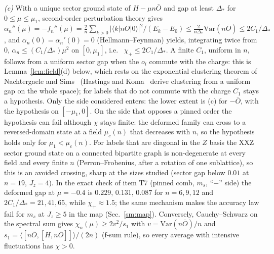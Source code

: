 \documentclass[aps,prx,onecolumn,10pt,nofootinbib,longbibliography,floatfix]{revtex4-2}
\theoremstyle{remark}
\newcommand{\Jz}{J_z}
\newcommand{\ms}{m_s}
\begin{document}
\emph{(c)} With a unique sector ground state of $H-\mu n\bar O$ and gap at least $\Delta_*$ for $0\le\mu\le\mu_1$, %
second-order perturbation theory gives $\alpha_n''(\mu)=-f_n''(\mu)=\frac2n\sum_{k>0} %
|\langle k|n\bar O|0\rangle|^2/(E_k-E_0)\le\frac{2}{n\Delta_*}\mathrm{Var}(n\bar O)\le2C_1/\Delta_*$, and %
$\alpha_n(0)=\alpha_n'(0)=0$ (Hellmann--Feynman) yields, integrating twice from $0$, $\alpha_n\le(C_1/\Delta_*)\mu^2$ on $[0,\mu_1]$, i.e.\ %
$\chi_+\le2C_1/\Delta_*$. A finite $C_1$, uniform in $n$, follows from a uniform sector gap when the $o_i$ commute %
with the charge: this is Lemma~\ref{lem:field}(d) below, which rests on the exponential clustering theorem of
Nachtergaele and Sims~\cite{nachtergaele2006} (Hastings and Koma~\cite{hastings2006} derive clustering from a uniform
gap on the whole space); for labels that do not commute with the charge $C_1$ stays a hypothesis. Only the side
considered enters:
the lower extent is (c) for $-\bar O$, with the hypothesis on $[-\mu_1,0]$. On the side that opposes a pinned order
the hypothesis can fail although $\chi$ stays finite: the deformed family can cross to a reversed-domain state at
a field $\mu_c(n)$ that decreases with $n$, so the hypothesis holds only for $\mu_1<\mu_c(n)$. For labels that are
diagonal in the $Z$ basis the XXZ sector ground state on a connected bipartite graph is non-degenerate at every
field and every finite $n$ (Perron--Frobenius, after a rotation of one sublattice), so this is an avoided crossing, sharp at the sizes studied
(sector gap below $0.01$ at $n=19$, $\Jz=4$). In the exact check %
of item T7 (pinned comb, $\ms$, ``$-$'' side) the deformed gap at $\mu=-0.4$ is $0.229$, $0.131$, $0.087$ for %
$n=6,9,12$ and $2C_1/\Delta_*=21,41,65$, while $\chi_+\approx1.5$; the same mechanism makes the accuracy law fail %
for $\ms$ at $\Jz\ge5$ in the map (Sec.~\ref{sm:map}). Conversely, Cauchy--Schwarz on the
spectral sum gives $\chi_n(\mu)\ge2v^2/s_1$ with $v=\mathrm{Var}(n\bar O)/n$ and %
$s_1=\langle[n\bar O,[H,n\bar O]]\rangle/(2n)$ (f-sum rule), so every average with intensive fluctuations has $\chi>0$. %
\end{document}
